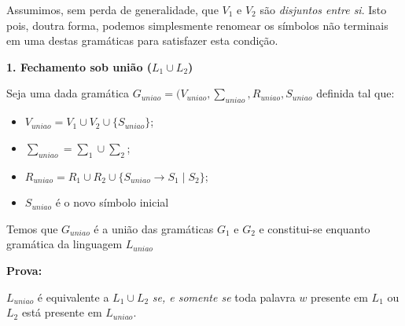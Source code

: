 \documentclass[12pt]{article}
\begin{document}
\begin{enumerate}
	      Assumimos, sem perda de generalidade, que $V_1$ e $V_2$ são
	      \textit{disjuntos entre si}. Isto pois, doutra forma, podemos
	      simplesmente renomear os símbolos não terminais em uma destas
	      gramáticas para satisfazer esta condição.
	      
	      \textbf{1. Fechamento sob união ($L_1 \cup L_2$)}
	      
	      Seja uma dada gramática $G_{uniao} = (V_{uniao}, \sum_{uniao},
		      R_{uniao}, S_{uniao}$ definida tal que:
	      
	      \begin{itemize}
		      \item $V_{uniao} = V_1 \cup V_2 \cup \{S_{uniao}\}$;
		      \item $\sum_{uniao} = \sum_1 \cup \sum_2$;
		      \item $R_{uniao} = R_1 \cup R_2 \cup \{S_{uniao} \rightarrow S_1
			            \mid S_2\}$;
		      \item $S_{uniao}$ é o novo símbolo inicial
	      \end{itemize}
	      
	      Temos que $G_{uniao}$ é a união das gramáticas $G_1$ e $G_2$ e
	      constitui-se enquanto gramática da linguagem $L_{uniao}$
	      
	      \textbf{Prova:}
	      
	      $L_{uniao}$ é equivalente a $L_1 \cup L_2$ \textit{se, e somente se}
	      toda palavra $w$ presente em $L_1$ ou $L_2$ está presente em
	      $L_{uniao}$.
	      

\end{enumerate}
\end{document}
